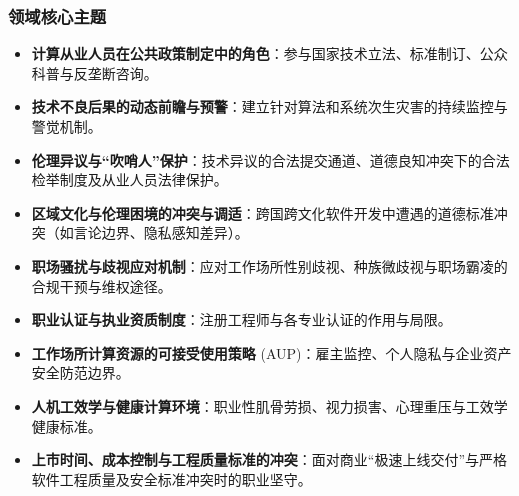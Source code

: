 \subsubsection{领域核心主题}
\begin{itemize}
    \item \textbf{计算从业人员在公共政策制定中的角色}：参与国家技术立法、标准制订、公众科普与反垄断咨询。
    \item \textbf{技术不良后果的动态前瞻与预警}：建立针对算法和系统次生灾害的持续监控与警觉机制。
    \item \textbf{伦理异议与“吹哨人”保护}：技术异议的合法提交通道、道德良知冲突下的合法检举制度及从业人员法律保护。
    \item \textbf{区域文化与伦理困境的冲突与调适}：跨国跨文化软件开发中遭遇的道德标准冲突（如言论边界、隐私感知差异）。
    \item \textbf{职场骚扰与歧视应对机制}：应对工作场所性别歧视、种族微歧视与职场霸凌的合规干预与维权途径。
    \item \textbf{职业认证与执业资质制度}：注册工程师与各专业认证的作用与局限。
    \item \textbf{工作场所计算资源的可接受使用策略} (AUP)：雇主监控、个人隐私与企业资产安全防范边界。
    \item \textbf{人机工效学与健康计算环境}：职业性肌骨劳损、视力损害、心理重压与工效学健康标准。
    \item \textbf{上市时间、成本控制与工程质量标准的冲突}：面对商业“极速上线交付”与严格软件工程质量及安全标准冲突时的职业坚守。
\end{itemize}

